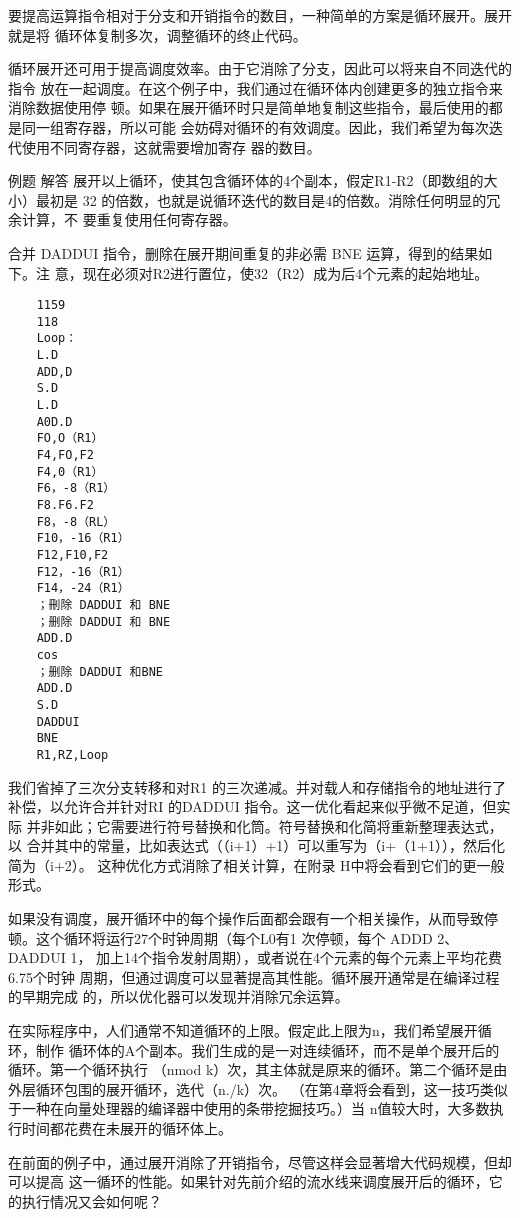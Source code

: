 要提高运算指令相对于分支和开销指令的数目，一种简单的方案是循环展开。展开就是将
循环体复制多次，调整循环的终止代码。

循环展开还可用于提高调度效率。由于它消除了分支，因此可以将来自不同迭代的指令
放在一起调度。在这个例子中，我们通过在循环体内创建更多的独立指令来消除数据使用停
顿。如果在展开循环时只是简单地复制这些指令，最后使用的都是同一组寄存器，所以可能
会妨碍对循环的有效调度。因此，我们希望为每次迭代使用不同寄存器，这就需要增加寄存
器的数目。

例题
解答
展开以上循环，使其包含循环体的4个副本，假定R1-R2（即数组的大小）最初是
32 的倍数，也就是说循环迭代的数目是4的倍数。消除任何明显的冗余计算，不
要重复使用任何寄存器。

合并 DADDUI 指令，删除在展开期间重复的非必需 BNE 运算，得到的结果如下。注
意，现在必须对R2进行置位，使32（R2）成为后4个元素的起始地址。
\begin{verbatim}
    1159
    118
    Loop：
    L.D
    ADD,D
    S.D
    L.D
    A0D.D
    FO,O（R1）
    F4,FO,F2
    F4,0（R1）
    F6，-8（R1）
    F8.F6.F2
    F8，-8（RL）
    F10，-16（R1）
    F12,F10,F2
    F12，-16（R1）
    F14，-24（R1）
    ；刪除 DADDUI 和 BNE
    ；删除 DADDUI 和 BNE
    ADD.D
    cos
    ；删除 DADDUI 和BNE
    ADD.D
    S.D
    DADDUI
    BNE
    R1,RZ,Loop
\end{verbatim}
我们省掉了三次分支转移和对R1 的三次递减。并对载人和存储指令的地址进行了
补偿，以允许合并针对RI 的DADDUI 指令。这一优化看起来似乎微不足道，但实际
并非如此；它需要进行符号替换和化筒。符号替换和化简将重新整理表达式，以
合并其中的常量，比如表达式（（i+1）+1）可以重写为（i+（1+1）），然后化简为（i+2）。
这种优化方式消除了相关计算，在附录 H中将会看到它们的更一般形式。

如果没有调度，展开循环中的每个操作后面都会跟有一个相关操作，从而导致停
顿。这个循环将运行27个时钟周期（每个L0有1 次停顿，每个 ADDD 2、DADDUI 1，
加上14个指令发射周期），或者说在4个元素的每个元素上平均花费 6.75个时钟
周期，但通过调度可以显著提高其性能。循环展开通常是在编译过程的早期完成
的，所以优化器可以发现并消除冗余运算。

在实际程序中，人们通常不知道循环的上限。假定此上限为n，我们希望展开循环，制作
循环体的A个副本。我们生成的是一对连续循环，而不是单个展开后的循环。第一个循环执行
（nmod k）次，其主体就是原来的循环。第二个循环是由外层循环包围的展开循环，选代（n./k）次。
（在第4章将会看到，这一技巧类似于一种在向量处理器的编译器中使用的条带挖掘技巧。）当
n值较大时，大多数执行时间都花费在未展开的循环体上。

在前面的例子中，通过展开消除了开销指令，尽管这样会显著增大代码规模，但却可以提高
这一循环的性能。如果针对先前介绍的流水线来调度展开后的循环，它的执行情况又会如何呢？

